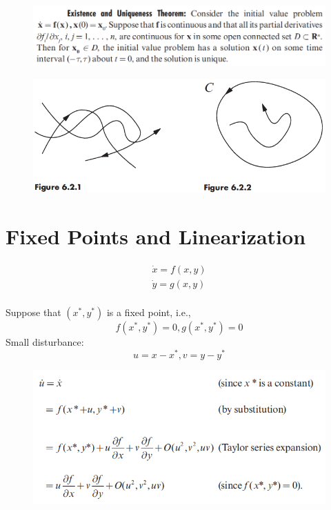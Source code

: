 \documentclass[10pt,aspectratio=43,mathserif,table]{beamer}
\begin{document}
\begin{frame}
    \begin{figure}
        \centering
        \includegraphics[width=\linewidth]{Existence and Uniqueness Theorem.jpg}
    \end{figure}

    \begin{figure}
        \centering
        \includegraphics[width=0.8\linewidth]{f621_622.jpg}
    \end{figure}
\end{frame}

\section{Fixed Points and Linearization} %



\begin{frame}
    $$
    \begin{array}{c}
        \dot{x}=f\left( x,y \right)\\
        \dot{y}=g\left( x,y \right)\\
    \end{array}
    $$

    Suppose that $(x^*,y^*)$ is a fixed point, i.e.,
    $$
    f\left( x^*,y^* \right) =0, g\left( x^*,y^* \right) =0
    $$
    Small disturbance:
    $$
    u=x-x^*,v=y-y^*
    $$


    \begin{figure}
        \centering
        \includegraphics[width=0.8\linewidth]{Linearization.png}
    \end{figure}
\end{frame}
\end{document}
